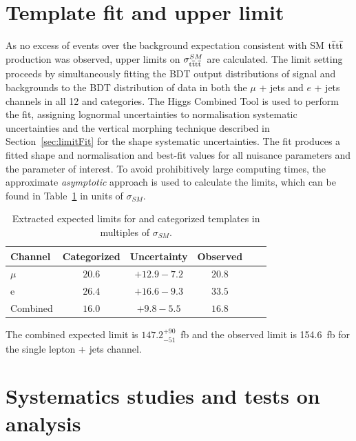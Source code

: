 \section{Template fit and upper limit}
\label{sec:limit13}
As no excess of events over the background expectation consistent with SM $\mathrm{t}\overline{\mathrm{t}}\mathrm{t}\overline{\mathrm{t}}$ production was observed, upper limits on $\sigma_{\mathrm{t}\overline{\mathrm{t}}\mathrm{t}\overline{\mathrm{t}}}^{SM}$ are calculated. 
The limit setting proceeds by simultaneously fitting the BDT output distributions of signal and backgrounds to the BDT distribution of data in both the $\mu$ + jets and $e$ + jets channels in all 12 \njets and \nMtags categories. The Higgs Combined Tool is used to perform the fit, assigning lognormal uncertainties to normalisation systematic uncertainties and the vertical morphing technique described in Section~\ref{sec:limitFit} for the shape systematic uncertainties. The fit produces a fitted shape and normalisation and best-fit values for all nuisance parameters and the parameter of interest. 
To avoid prohibitively large computing times, the approximate \emph{asymptotic} approach is used to calculate the \CLS limits, which can be found in Table~\ref{tab:limits} in units of $\sigma_{SM}$. 

\begin{table}[ht!]
\centering
\begin{tabular}{| l | c | c | c | c | c |}
  \hline
Channel  & Categorized & Uncertainty & Observed\\
 \hline
$\mu$  &$20.6$ & $+12.9 -7.2$ & $20.8$ \\
 \hline
e  &  $26.4$ & $+16.6 -9.3$ & $33.5$ \\
 \hline
 Combined  &  $16.0$ & $+9.8 -5.5$ & $16.8$ \\
 \hline
\end{tabular}
 \caption{Extracted expected limits for \njets and \nMtags categorized templates in multiples of $\sigma_{SM}$.}
  \label{tab:limits}
  \end{table}

The combined expected limit is $147.2^{+90}_{-51}$~fb and the observed limit is 154.6~fb for the single lepton + jets channel.

\section{Systematics studies and tests on analysis}


